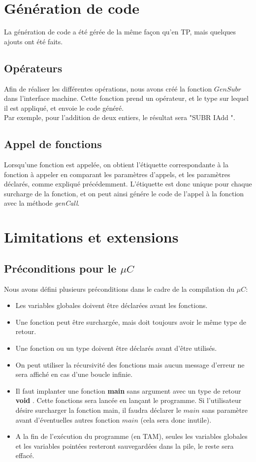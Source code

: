 \documentclass[11pt,a4paper]{report}
\begin{document}
\section{Génération de code}

La génération de code a été gérée de la même façon qu'en TP, mais quelques ajouts ont été faits.

\subsection{Opérateurs}

Afin de réaliser les différentes opérations, nous avons créé la fonction 
$GenSubr$ dans l'interface machine. Cette fonction prend un opérateur, et le type sur lequel il est appliqué, et envoie le code généré. \\
Par exemple, pour l'addition de deux entiers, le résultat sera "SUBR IAdd ".

\subsection{Appel de fonctions}

Lorsqu'une fonction est appelée, on obtient l'étiquette correspondante à la fonction à appeler en comparant les paramètres d'appels, et les paramètres déclarés, comme expliqué précédemment. 
L'étiquette est donc unique pour chaque surcharge de la fonction, et on peut ainsi génére le code de l'appel à la fonction avec la méthode \textsl{genCall}.


\section{Limitations et extensions}

\subsection{Préconditions pour le $\mu C$}

Nous avons défini plusieurs préconditions dans le cadre de la compilation du $\mu C$:
\begin{itemize}
\item Les variables globales doivent être déclarées avant les fonctions.
\item Une fonction peut être surchargée, mais doit toujours avoir le même type de retour.
\item Une fonction ou un type doivent être déclarés avant d'être utilisés.
\item On peut utiliser la récursivité des fonctions mais aucun message d'erreur ne sera affiché en cas d'une boucle infinie.
\item Il faut implanter une fonction \textbf{main}  sans argument avec un type de retour \textbf{void} . Cette fonctions sera lancée en lançant le programme. Si l'utilisateur désire surcharger la fonction main, il faudra déclarer le $main$ sans paramètre avant d'éventuelles autres fonction $main$ (cela sera donc inutile).
\item A la fin de l'exécution du programme (en TAM), seules les variables globales et les variables pointées resteront sauvegardées dans la pile, le reste sera effacé.
\end{itemize}
\end{document}
